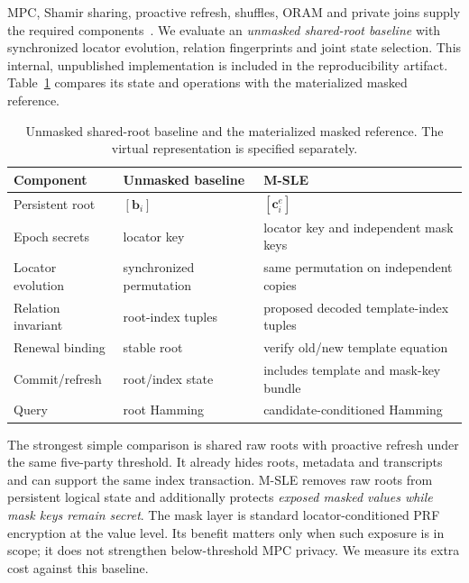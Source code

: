\documentclass[journal]{IEEEtran}
\newcommand{\MSLE}{\textsc{M-SLE}\xspace}
\newcommand{\rowdivider}{\specialrule{0.25pt}{0.35ex}{0.35ex}}
\begin{document}
MPC, Shamir sharing, proactive refresh, shuffles, ORAM and private joins supply the required components~\cite{shamir1979share,keller2020mpspdz,herzberg1995proactive,stefanov2013pathoram,mohassel2020joins}. We evaluate an \emph{unmasked shared-root baseline} with synchronized locator evolution, relation fingerprints and joint state selection. This internal, unpublished implementation is included in the reproducibility artifact. Table~\ref{tab:extension} compares its state and operations with the materialized masked reference.
\begin{table}[t]
\caption{Unmasked shared-root baseline and the materialized masked reference. The virtual representation is specified separately.}
\label{tab:extension}\centering\small
\renewcommand{\arraystretch}{1.04}
\begin{tabularx}{\columnwidth}{>{\raggedright\arraybackslash}p{}>{\raggedright\arraybackslash}X>{\raggedright\arraybackslash}X}
\toprule Component & Unmasked baseline & \MSLE \\
\midrule Persistent root & $[\mathbf b_i]$ & $[\mathbf c_i^e]$ \\ \rowdivider
Epoch secrets & locator key & locator key and independent mask keys \\ \rowdivider
Locator evolution & synchronized permutation & same permutation on independent copies \\ \rowdivider
Relation invariant & root-index tuples & proposed decoded template-index tuples \\ \rowdivider
Renewal binding & stable root & verify old/new template equation \\ \rowdivider
Commit/refresh & root/index state & includes template and mask-key bundle \\ \rowdivider
Query & root Hamming & candidate-conditioned Hamming \\
\bottomrule
\end{tabularx}
\end{table}

The strongest simple comparison is shared raw roots with proactive refresh under the same five-party threshold. It already hides roots, metadata and transcripts and can support the same index transaction. \MSLE removes raw roots from persistent logical state and additionally protects \emph{exposed masked values while mask keys remain secret}. The mask layer is standard locator-conditioned PRF encryption at the value level. Its benefit matters only when such exposure is in scope; it does not strengthen below-threshold MPC privacy. We measure its extra cost against this baseline.
\end{document}
